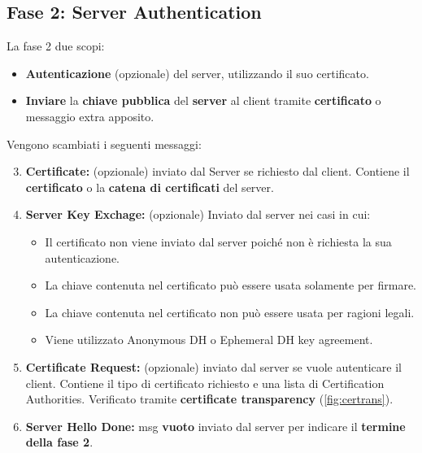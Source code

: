 \subsection{Fase 2: Server Authentication}
La fase 2 due scopi:
\begin{proposition}[Phase 2]\label{prop:phase2}
\begin{itemize}
    \item \textbf{Autenticazione} (opzionale) del server, utilizzando il suo certificato.
    \item \textbf{Inviare} la \textbf{chiave pubblica} del \textbf{server} al client tramite \textbf{certificato} o messaggio extra apposito.
\end{itemize}
\end{proposition}
Vengono scambiati i seguenti messaggi:
\begin{definition}\label{def:hand2}
\begin{enumerate}  \setcounter{enumi}{2}
    \item \textbf{Certificate:} (opzionale) inviato dal Server se richiesto dal client. Contiene il \textbf{certificato} o la \textbf{catena di certificati} del server.
    \item \textbf{Server Key Exchage:} (opzionale) Inviato dal server nei casi in cui:
    \begin{itemize}
        \item Il certificato non viene inviato dal server poiché non è richiesta la sua autenticazione. 
        \item  La chiave contenuta nel certificato può essere usata solamente per firmare.    
        \item La chiave contenuta nel certificato non può essere usata per ragioni legali.
        \item Viene utilizzato Anonymous DH o Ephemeral DH key agreement.
    \end{itemize}
    \item\textbf{ Certificate Request:} (opzionale) inviato dal server se vuole autenticare il client. Contiene il tipo di certificato richiesto e una lista di Certification Authorities. Verificato tramite \textbf{certificate transparency} (\cref{fig:certrans}).
    \item \textbf{Server Hello Done:} msg \textbf{vuoto} inviato dal server per indicare il \textbf{termine della fase 2}.
\end{enumerate}
\end{definition}

